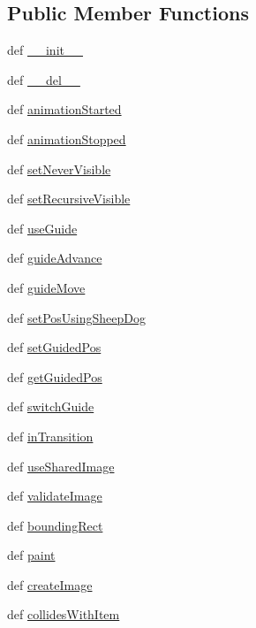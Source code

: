 \subsection*{Public Member Functions}
\begin{DoxyCompactItemize}
\item 
def \hyperlink{classdemoitem_1_1DemoItem_a7d37bfbc0d53531511bb14bb000c25d5}{\+\_\+\+\_\+init\+\_\+\+\_\+}
\item 
def \hyperlink{classdemoitem_1_1DemoItem_abf88d720bb0e1bb13b9a0634faa7c84d}{\+\_\+\+\_\+del\+\_\+\+\_\+}
\item 
def \hyperlink{classdemoitem_1_1DemoItem_a7f55f391a21b9bdfbbf3375f25065433}{animation\+Started}
\item 
def \hyperlink{classdemoitem_1_1DemoItem_ad274d72116f0697058e5cb9b9c878f82}{animation\+Stopped}
\item 
def \hyperlink{classdemoitem_1_1DemoItem_a89b7997a27c4202b05b1451525588c4f}{set\+Never\+Visible}
\item 
def \hyperlink{classdemoitem_1_1DemoItem_a345e8686228f505c482fa5d91e254e27}{set\+Recursive\+Visible}
\item 
def \hyperlink{classdemoitem_1_1DemoItem_a569aed32f27e81828626c1ea910a8664}{use\+Guide}
\item 
def \hyperlink{classdemoitem_1_1DemoItem_a587510dd39d5f13c3b216a7b3b4f1c51}{guide\+Advance}
\item 
def \hyperlink{classdemoitem_1_1DemoItem_a70216ff4ddd9de4d7c25ff516854285e}{guide\+Move}
\item 
def \hyperlink{classdemoitem_1_1DemoItem_ad4c710c7b3cfdc5ad46bff5b2afa842a}{set\+Pos\+Using\+Sheep\+Dog}
\item 
def \hyperlink{classdemoitem_1_1DemoItem_a1987ae8e718ce1b5fafb4434cbf28555}{set\+Guided\+Pos}
\item 
def \hyperlink{classdemoitem_1_1DemoItem_a32cea7b5fda2859a9ff47a86bdbc4f4d}{get\+Guided\+Pos}
\item 
def \hyperlink{classdemoitem_1_1DemoItem_af375d6c5e11a9419844b50e5033eeba5}{switch\+Guide}
\item 
def \hyperlink{classdemoitem_1_1DemoItem_af63098a547a54cfbd8be3ec47b221df4}{in\+Transition}
\item 
def \hyperlink{classdemoitem_1_1DemoItem_a7d6aee3854dd9113614208411ff6d5fe}{use\+Shared\+Image}
\item 
def \hyperlink{classdemoitem_1_1DemoItem_a95acb0f174be8d2f79eab5fb7e74151e}{validate\+Image}
\item 
def \hyperlink{classdemoitem_1_1DemoItem_a279d7630c6ddf05474dfe61b83a44618}{bounding\+Rect}
\item 
def \hyperlink{classdemoitem_1_1DemoItem_a8acfdf0e5372a64f42b7eedc7dfdf060}{paint}
\item 
def \hyperlink{classdemoitem_1_1DemoItem_a56da992135a0dabfe36d6c93683479c4}{create\+Image}
\item 
def \hyperlink{classdemoitem_1_1DemoItem_abcf927122127c622517b876252b9c18c}{collides\+With\+Item}
\end{DoxyCompactItemize}

